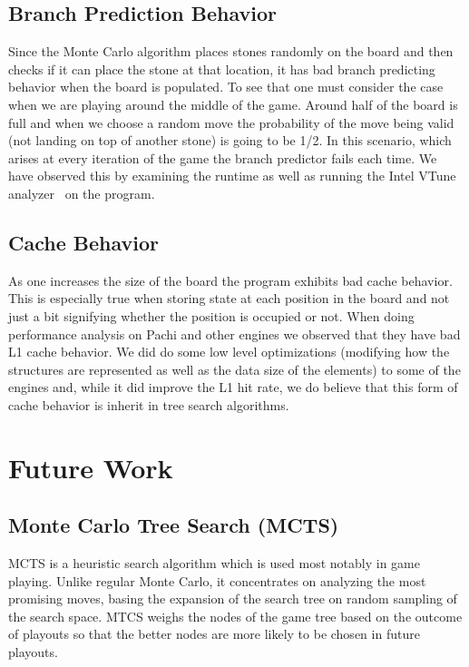 \documentclass[nocopyrightspace, 10pt]{sigplanconf}
\begin{document}
\subsection{Branch Prediction Behavior}

Since the  Monte Carlo algorithm places stones randomly on the board and then checks if it can place the stone at that location, it has bad branch predicting behavior when the board is populated. To see that one must consider the case when we are playing around the middle of the game. Around half of the board is full and when we choose a random move the probability of the move being valid (not landing on top of another stone) is going to be 1/2. In this scenario, which arises at every iteration of the game the branch predictor fails each time. We have observed this by examining the runtime as well as running the Intel VTune analyzer~\cite{vtune} on the program.


\subsection{Cache Behavior}

As one increases the size of the board the program exhibits bad cache behavior. This is especially true when storing state at each position in the board and not just a bit signifying whether the position is occupied or not. When doing performance analysis on Pachi and other engines we observed that they have bad L1 cache behavior. We did do some low level optimizations (modifying how the structures are represented as well as the data size of the elements) to some of the engines and, while it did improve the L1 hit rate, we do believe that this form of cache behavior is inherit in tree search algorithms.





\section{Future Work}
\subsection{Monte Carlo Tree Search (MCTS)}
MCTS is a heuristic search algorithm which is used most notably in game playing. Unlike regular Monte Carlo, it concentrates on analyzing the most promising moves, basing the expansion of the search tree on random sampling of the search space. MTCS weighs the nodes of the game tree based on the outcome of playouts so that the better nodes are more likely to be chosen in future playouts. 
\end{document}
